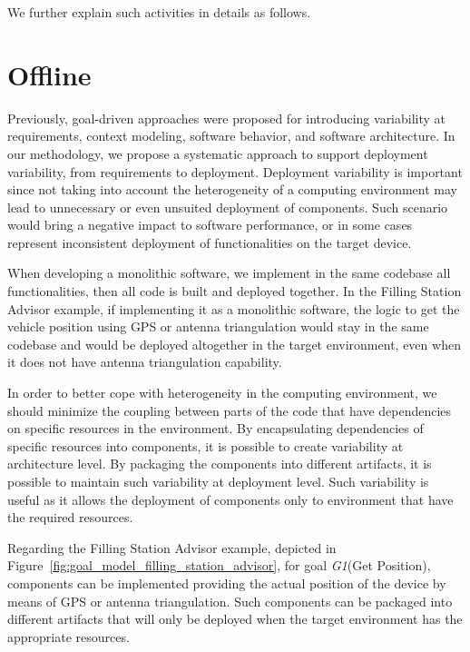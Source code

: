 We further explain such activities in details as follows.


\section{Offline}

Previously, goal-driven  approaches were proposed for introducing variability at requirements, context modeling, software behavior, and software architecture\cite{angelopoulos_capturing_2015}\cite{yu_goals_2008}.
In our methodology, we propose a systematic approach to support deployment variability, from requirements to deployment.
Deployment variability is important since not taking into account the heterogeneity of a computing environment may lead to unnecessary or even unsuited deployment of components.
Such scenario would bring a negative impact to software performance, or in some cases represent inconsistent deployment of functionalities on the target device.

When developing a monolithic software, we implement in the same codebase all functionalities, then all code is built and deployed together.
In the Filling Station Advisor example, if implementing it as a monolithic software, the logic to get the vehicle position using GPS or antenna triangulation would stay in the same codebase and would be deployed altogether in the target environment, even when it does not have antenna triangulation capability.


In order to better cope with heterogeneity in the computing environment, we should minimize the coupling between parts of the code that have dependencies on specific resources in the environment.
By encapsulating dependencies of specific resources into components, it is possible to create variability at architecture level. By packaging the components into different artifacts, it is possible to maintain such variability at deployment level. Such variability is useful as it allows the deployment of components only to environment that have the required resources.

Regarding the Filling Station Advisor example, depicted in Figure~\ref{fig:goal_model_filling_station_advisor}, for goal \emph{G1}(Get Position), components can be implemented providing the actual position of the device by means of GPS or antenna triangulation. Such components can be packaged into different artifacts that will only be deployed when the target environment has the appropriate resources.

